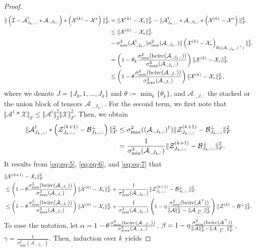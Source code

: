 \documentclass[11pt]{article}
\def\fm#1{\mathcal{#1}}
\def \a#1{\fm A_{:, #1, :}}
\def \ai#1{\fm A_{#1, :, :}}
\def \z#1#2{\fm Z^{(#1)}_{#2, :, :}}
\def \bp#1{\fm B^{\perp}_{#1, :, :}}
\def \x#1{\fm X^{(#1)}}
\begin{document}
\begin{proof}
\begin{align}
\Vert \left( \fm I - \ai{J_k}^\dagger *  \a{J_k} \right) *\left(\x k - \fm X^\ast   \right) \Vert_F^2  & = \Vert \x k - \fm X_\ast \Vert_F^2 - \Vert  \ai{J_k}^\dagger *  \a{J_k}  *\left(\x k - \fm X^\ast   \right) \Vert_F^2  \notag\\
& \leq  \Vert \x k - \fm X_\ast \Vert_F^2  \notag\\
& -\sigma_{\min}^2(\a{J_k}^\dagger) \sigma_{\min}^2(\a{J_k}) \Vert\left( \x{k} - \fm X_\ast \right)_{\text{R}((\a{J_k})^\top)} \Vert_F^2 \notag\\
& = \left( 1 - \theta_k \frac{\sigma_{\min}^2(\bcirc(\a{J_k}))}{\sigma^2_{\max}(\a{J_k})}\right) \Vert \x k - \fm X_\ast \Vert_F^2 \notag  \\
& \leq \left( 1 - \theta \frac{\sigma_{\min}^2(\bcirc(\a{J}))}{\sigma^2_{\max}(\a{J})}\right) \Vert \x k - \fm X_\ast \Vert_F^2 \label{eq:eq-6}, 
\end{align}
where we denote $J = \{J_0, 1, \ldots, J_k \}$ and $\theta:= \min_{k} \{\theta_k \}$, and $\a{J}$ the stacked or the union block of tensors  $\a{J_k}$. For the second term,  we first note that $\Vert \fm A^\dagger * \fm X \Vert_F \leq \Vert \fm A ^\dagger \Vert_2^2 \Vert \fm X \Vert_F^2$. Then, we obtain
\begin{align}
  \Vert  \ai{J_k}^\dagger* \left(\z{k+1}{J_k} - \bp{J_k}  \right) \Vert_F^2  & \leq \sigma_{\max}^2((\a{J_k})^\dagger) \Vert  \z{k+1}{J_k} - \bp{J_k} \Vert_F^2 \notag\\
  & = \frac{1}{\sigma_{\min}^2(\a{J_k})} \Vert  \z{k+1}{J_k} - \bp{J_k} \Vert_F^2.
  \label{eq:eq-7}
\end{align}
It results from  \eqref{eq:eq-5}, \eqref{eq:eq-6}, and \eqref{eq:eq-7} that
\begin{align*}
 & \Vert \x{k+1} - \fm X_\ast \Vert_F^2 \\
 &  \leq \left( 1 - \theta \frac{\sigma_{\min}^2(\bcirc(\a{J}))}{\sigma^2_{\max}(\a{J})}\right) \Vert \x k - \fm X_\ast \Vert_F^2 +  \frac{1}{\sigma_{\min}^2(\a{J_k})} \Vert  \z{k+1}{J_k} - \bp{J_k} \Vert_F^2\\
 & \leq \left( 1 - \theta \frac{\sigma_{\min}^2(\bcirc(\a{J}))}{\sigma^2_{\max}(\a{J})}\right) \Vert \x k - \fm X_\ast \Vert_F^2 + \frac{1}{\sigma_{\min}^2(\a{J_k})} \left( 1 - \eta  \frac{\sigma_{\min}^2(\bcirc(\fm A^\top))}{\Vert \fm A \Vert_F^2 - \Vert \a{\overline{U}} \Vert_F^2}   \right) \Vert  \fm Z^{(k)} - \fm B^\perp \Vert_F^2 .
\end{align*}
To ease the notation, let $\alpha =  1 - \theta \frac{\sigma_{\min}^2(\bcirc(\a{J}))}{\sigma^2_{\max}(\a{J})}$, $\beta = 1 - \eta  \frac{\sigma_{\min}^2(\bcirc(\fm A^\top))}{\Vert \fm A \Vert_F^2 - \Vert \a{\overline{U}} \Vert_F^2}  $, \; $\gamma =\frac{1}{\sigma_{\min}^2(\a{J_k})}$. Then, induction over $k$ yields

\end{proof}
\end{document}
